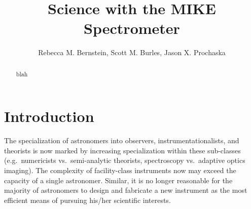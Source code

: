 \documentclass[12pt,preprint]{aastex}
\begin{document}
\newcommand{\ndla}{71}
\newcommand{\kms}{km~s$^{-1}$ }
\newcommand{\cm}[1]{\, {\rm cm^{#1}}}
\newcommand{\mkms}{{\rm \; km\;s^{-1}}}
\newcommand{\delv}{\Delta v}
\newcommand{\ohi}{$\Omega_g$}
\newcommand{\lya}{Ly$\alpha$}
\newcommand{\nv}{N\,V}
\newcommand{\ovi}{O\,VI}
\newcommand{\N}[1]{{N({\rm #1})}}
\newcommand{\sci}[1]{{\rm \; \times \; 10^{#1}}}
\newcommand{\slla}{SLLS0927+5621}
\newcommand{\sllb}{SLLS0953+5230}
\newcommand{\mnhi}{N_{\rm HI}}
\newcommand{\mnciv}{N_{\rm CIV}}
\newcommand{\nhi}{$N_{\rm HI}$}
\def\fnhi{$f_{\rm{HI}} (\mnhi)$}
\def\mfnhi{f_{\rm{HI}} (\mnhi)}
\def\ltk{\left [ \,}
\def\ltp{\left ( \,}
\def\ltb{\left \{ \,}
\def\rtk{\, \right  ] }
\def\rtp{\, \right  ) }
\def\rtb{\, \right \} }
\def\nhi{$N_{\rm HI}$}
\def\lnhi{$\log N_{HI}$}
\def\omt{$\Omega_m^{Total}$}
\def\momt{\Omega_m^{Total}}

\title{Science with the MIKE Spectrometer}

\author{
Rebecca M. Bernstein,
Scott M. Burles,
Jason X. Prochaska}


\begin{abstract}
blah
\end{abstract}


\section{Introduction}

The specialization of astronomers into observers, instrumentationalists,
and theorists is now marked by increasing specialization
within these sub-classes (e.g.\ numericists vs.\ semi-analytic theorists,
spectroscopy vs.\ adaptive optics imaging).
The complexity of facility-class instruments now may
exceed the capacity of a single astronomer.
Similar, it is no longer reasonable for the majority of
astronomers to design and fabricate a new instrument
as the most efficient means of pursuing his/her scientific interests.  
\end{document}
